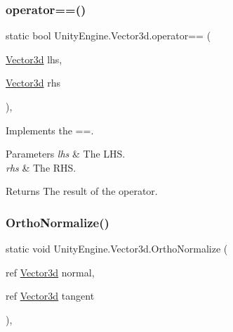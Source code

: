 \subsubsection{\texorpdfstring{operator==()}{operator==()}}
{\footnotesize\ttfamily static bool Unity\+Engine.\+Vector3d.\+operator== (\begin{DoxyParamCaption}\item[{\hyperlink{struct_unity_engine_1_1_vector3d}{Vector3d}}]{lhs,  }\item[{\hyperlink{struct_unity_engine_1_1_vector3d}{Vector3d}}]{rhs }\end{DoxyParamCaption})\hspace{0.3cm}{\ttfamily [inline]}, {\ttfamily [static]}}



Implements the ==. 


\begin{DoxyParams}{Parameters}
{\em lhs} & The L\+HS.\\
\hline
{\em rhs} & The R\+HS.\\
\hline
\end{DoxyParams}
\begin{DoxyReturn}{Returns}
The result of the operator.
\end{DoxyReturn}
\mbox{\label{struct_unity_engine_1_1_vector3d_aa627f58e5e64da8c3106df10f40ea8a0}} 
\subsubsection{\texorpdfstring{Ortho\+Normalize()}{OrthoNormalize()}\hspace{0.1cm}{\footnotesize\ttfamily [1/2]}}
{\footnotesize\ttfamily static void Unity\+Engine.\+Vector3d.\+Ortho\+Normalize (\begin{DoxyParamCaption}\item[{ref \hyperlink{struct_unity_engine_1_1_vector3d}{Vector3d}}]{normal,  }\item[{ref \hyperlink{struct_unity_engine_1_1_vector3d}{Vector3d}}]{tangent }\end{DoxyParamCaption})\hspace{0.3cm}{\ttfamily [inline]}, {\ttfamily [static]}}



